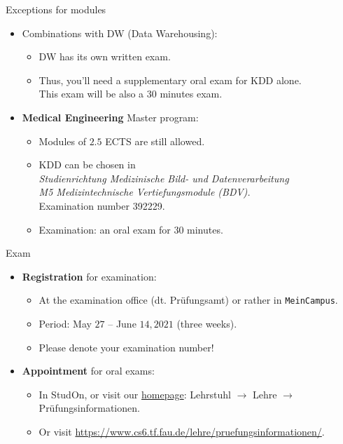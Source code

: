 \documentclass[aspectratio=169,t]{beamer}
\begin{document}
  { %
    \begin{frame}{Exceptions for modules}
      \begin{itemize}
          \item Combinations with DW (Data Warehousing):
                \begin{itemize}
                    \item DW has its own written exam.
                    \item Thus, you'll need a supplementary oral exam for KDD alone.\\
                          This exam will be also a $30$ minutes exam.
                \end{itemize}
          \item \textbf{Medical Engineering} Master program:
                \begin{itemize}
                    \item Modules of $2.5$ ECTS are still allowed.
                    \item KDD can be chosen in \\
                          \emph{Studienrichtung Medizinische Bild- und Datenverarbeitung \\ M5 Medizintechnische Vertiefungsmodule (BDV).}\\
                          Examination number 392229.
                    \item Examination: an oral exam for $30$ minutes.
                \end{itemize}
      \end{itemize}
    \end{frame}
  }

  { %
    \begin{frame}{Exam}
      \begin{itemize}
          \item \textbf{Registration} for examination:
                \begin{itemize}
                    \item At the examination office (dt. Prüfungsamt) or rather in \texttt{MeinCampus}.
                    \item Period: May $27$ -- June $14, 2021$ (three weeks).
                    \item Please denote your examination number!
                \end{itemize}
          \item \textbf{Appointment} for oral exams:
                \begin{itemize}
                    \item In StudOn, or visit our \href{https://www.cs6.tf.fau.de/lehre/pruefungsinformationen/}{homepage}: Lehrstuhl $\rightarrow$ Lehre $\rightarrow$ Prüfungsinformationen.
                    \item Or visit \url{https://www.cs6.tf.fau.de/lehre/pruefungsinformationen/}.
                \end{itemize}
      \end{itemize}
    \end{frame}
  }
\end{document}
